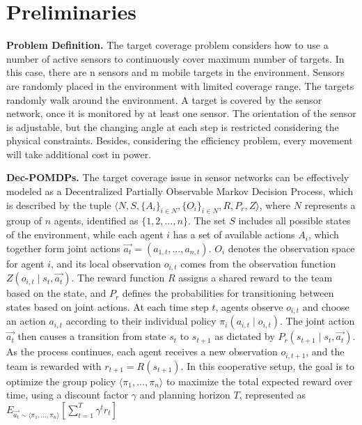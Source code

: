 \documentclass[preprint,12pt]{elsarticle}
\begin{document}
\section{Preliminaries} \label{Sec:HeWSN}
\noindent\textbf{Problem Definition.} The target coverage problem considers how to use a number of active sensors
to continuously cover maximum number of targets. In this case, there are n sensors and m mobile
targets in the environment. Sensors are randomly placed in the environment with limited coverage
range. The targets randomly walk around the environment. A target is covered by the sensor network,
once it is monitored by at least one sensor. The orientation of the sensor is adjustable, but the
changing angle at each step is restricted considering the physical constraints. Besides, considering
the efficiency problem, every movement will take additional cost in power.

\noindent\textbf{Dec-POMDPs.} The target coverage issue in sensor networks can be effectively modeled as a Decentralized Partially Observable Markov Decision Process, which is described by the tuple \( \langle N, S, \{A_i\}_{i \in N}, \{O_i\}_{i \in N}, R, P_r, Z \rangle \), where \( N \) represents a group of \( n \) agents, identified as \( \{1, 2, \dots, n\} \). The set \( S \) includes all possible states of the environment, while each agent \( i \) has a set of available actions \( A_i \), which together form joint actions \( \overset{\rightarrow}{a_t} = (a_{1,t}, \dots, a_{n,t}) \). \( O_i \) denotes the observation space for agent \( i \), and its local observation \( o_{i,t} \) comes from the observation function \( Z(o_{i,t}\mid s_t, \overset{\rightarrow}{a_t}) \). The reward function \( R \) assigns a shared reward to the team based on the state, and \( P_r \) defines the probabilities for transitioning between states based on joint actions.
At each time step \( t \), agents observe \( o_{i,t} \) and choose an action \( a_{i,t} \) according to their individual policy \( \pi_i(a_{i,t} \mid o_{i,t}) \). The joint action \( \overset{\rightarrow}{a_t} \) then causes a transition from state \( s_t \) to \( s_{t+1} \) as dictated by \( P_r(s_{t+1} \mid s_t, \overset{\rightarrow}{a_t}) \). As the process continues, each agent receives a new observation \( o_{i,t+1} \), and the team is rewarded with \( r_{t+1} = R(s_{t+1}) \). In this cooperative setup, the goal is to optimize the group policy \( \langle \pi_1, \dots, \pi_n \rangle \) to maximize the total expected reward over time, using a discount factor \( \gamma \) and planning horizon \( T \), represented as \( E_{\overset{\rightarrow}{a_t} \sim \langle \pi_1, \dots, \pi_n \rangle} \left[ \sum_{t=1}^{T} \gamma^t r_t \right] \) 
\end{document}
